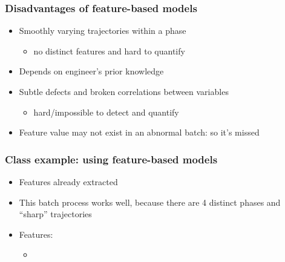 \documentclass[handout, 12pt]{beamer}
\begin{document}
\begin{frame}\frametitle{Disadvantages of feature-based models}

\begin{itemize}
	\item	Smoothly varying trajectories within a phase
	
			\begin{itemize}
				\item	no distinct features and hard to quantify
			\end{itemize}
			
	
	\item	Depends on engineer's prior knowledge
	
	\item	Subtle defects and broken correlations between variables 
	
			\begin{itemize}
				\item	hard/impossible to detect and quantify
			\end{itemize}
			

	\item	Feature value may not exist in an abnormal batch: so it's missed
	
\end{itemize}
\end{frame}
\item 

\begin{frame}\frametitle{Class example: using feature-based models}

\begin{itemize}
	\item	Features already extracted
	
	\item	This batch process works well, because there are 4 distinct phases and ``sharp'' trajectories
	
	
	\item	Features:
	
			\begin{itemize}
				\item	{}
			\end{itemize}
\end{itemize}




\end{frame}
\end{document}
